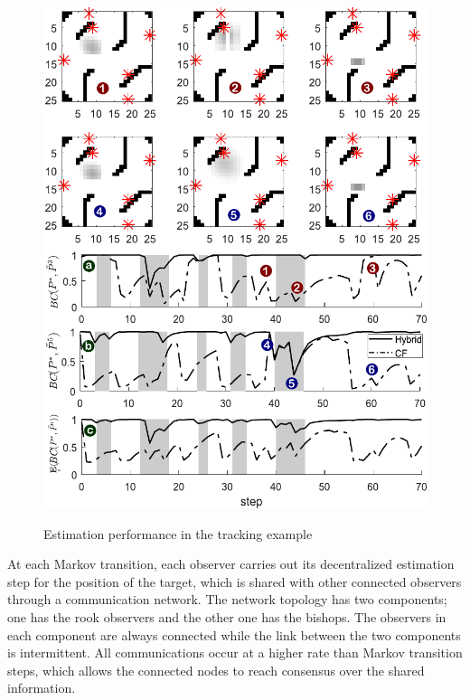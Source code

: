 \documentclass[conference]{IEEEtran}
\theoremstyle{remark}
\begin{document}
\begin{figure}[t]
	\centering
	{\includegraphics[width=.85\columnwidth]{./figs/exp2.pdf}}
	\caption{Estimation performance in the tracking example}
	\label{fig:exp2}
\end{figure}

At each Markov transition, each observer carries out its decentralized 
estimation step for the position of the target, which is shared with other 
connected observers through a communication network. The network topology has 
two components; one has the rook observers and the other one has the bishops. 
The observers in each component are always connected while the link between the 
two components is intermittent. All communications occur at a higher rate than 
Markov transition steps, which allows the connected nodes to reach consensus 
over the shared information.
\end{document}
